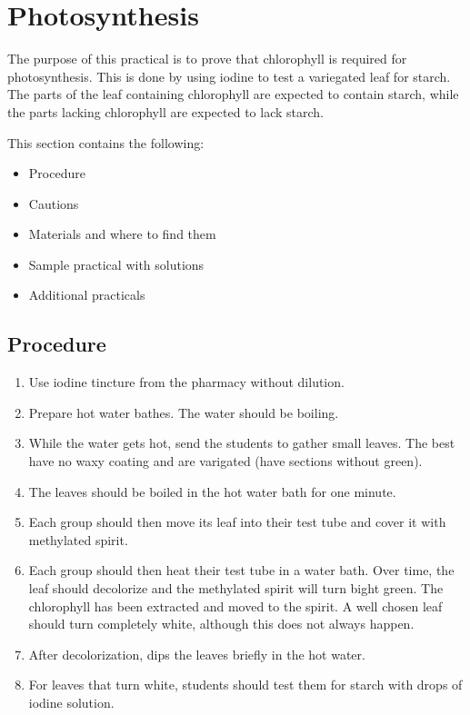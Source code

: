 \section{Photosynthesis}

The purpose of this practical is to prove that chlorophyll is required for photosynthesis. This is done by using iodine to test a variegated leaf for starch. The parts of the leaf containing chlorophyll are expected to contain starch, while the parts lacking chlorophyll are expected to lack starch.

This section contains the following:
\begin{itemize}
\item{Procedure}
\item{Cautions}
\item{Materials and where to find them}
\item{Sample practical with solutions}
\item{Additional practicals}
\end{itemize}

\subsection{Procedure}
\begin{enumerate}
\item{Use iodine tincture from the pharmacy without dilution.}
\item{Prepare hot water bathes. The water should be boiling.}
\item{While the water gets hot, send the students to gather small leaves. The best have no waxy coating and are varigated (have sections without green).}
\item{The leaves should be boiled in the hot water bath for one minute.}
\item{Each group should then move its leaf into their test tube and cover it with methylated spirit.}
\item{Each group should then heat their test tube in a water bath. Over time, the leaf should decolorize and the methylated spirit will turn bight green. The chlorophyll has been extracted and moved to the spirit. A well chosen leaf should turn completely white, although this does not always happen.}
\item{After decolorization, dips the leaves briefly in the hot water.}
\item{For leaves that turn white, students should test them for starch with drops of iodine solution.}
\end{enumerate}

